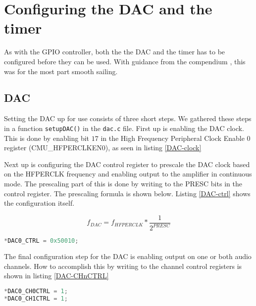 \section{Configuring the DAC and the timer}
As with the GPIO controller, both the the DAC and the timer has to be configured before they can be used. With guidance from the compendium \cite{compendium}, this was for the most part smooth sailing.

\subsection{DAC}

Setting the DAC up for use consists of three short steps. We gathered these steps in a function \texttt{setupDAC()} in the \texttt{dac.c} file. First up is enabling the DAC clock. This is done by enabling bit $17$ in the High Frequency Peripheral Clock Enable 0 register (CMU\_HFPERCLKEN0), as seen in listing \ref{DAC-clock}


Next up is configuring the DAC control register to prescale the DAC clock based on the HFPERCLK frequency and enabling output to the amplifier in continuous mode. The prescaling part of this is done by writing to the PRESC bits in the control register. The prescaling formula is shown below. Listing \ref{DAC-ctrl} shows the configuration itself.

\[f_{DAC} = f_{HFPERCLK} * \frac{1}{2^{PRESC}}\]

\begin{lstlisting}[language=C, label=DAC-ctrl, caption=Configuring]
*DAC0_CTRL = 0x50010;
\end{lstlisting}

The final configuration step for the DAC is enabling output on one or both audio channels. How to accomplish this by writing to the channel control registers is shown in listing \ref{DAC-CHnCTRL}

\begin{lstlisting}[language=C, label=DAC-CHnCTRL, caption=Enabling output to both audio channels]
*DAC0_CH0CTRL = 1;
*DAC0_CH1CTRL = 1;
\end{lstlisting}


